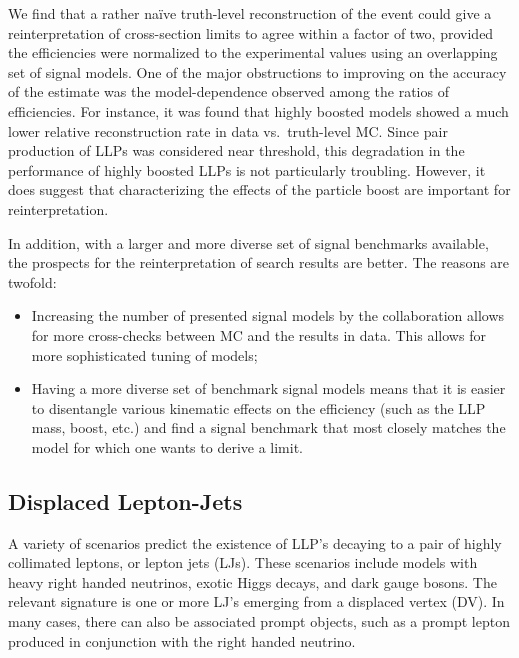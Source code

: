\vskip 0.1in
\vskip 0.1in

We find that a rather na\"ive truth-level reconstruction of the event could give a reinterpretation of cross-section limits to agree within a factor of two, provided the efficiencies were normalized to the experimental values using an overlapping set of signal models. One of the major obstructions to improving on the accuracy of the estimate was the model-dependence observed among the ratios of efficiencies. For instance, it was found that highly boosted models showed a much lower relative reconstruction rate in data vs.~truth-level MC. Since pair production of LLPs was considered near threshold, this degradation in the performance of highly boosted LLPs is not particularly troubling. However, it does suggest that characterizing the effects of the particle boost are important for reinterpretation.

In addition, with a larger and more diverse set of signal benchmarks available, the prospects for the reinterpretation of search results are better. The reasons are twofold:~
%
\begin{itemize}
\item Increasing the number of presented signal models by the collaboration allows for more cross-checks between MC and the results in data. This allows for more sophisticated tuning of models;
\item Having a more diverse set of benchmark signal models means that it is easier to disentangle various kinematic effects on the efficiency (such as the LLP mass, boost, etc.) and find a signal benchmark that most closely matches the model for which one wants to derive a limit.
\end{itemize}
%

\subsection{Displaced Lepton-Jets}

A variety of scenarios predict the existence of LLP's decaying to a pair of highly collimated leptons, or lepton jets (LJs). These scenarios include models with heavy right handed neutrinos, exotic Higgs decays, and dark gauge bosons. The relevant signature is one or more LJ's emerging from a displaced vertex (DV). In many cases, there can also be associated prompt objects, such as a prompt lepton produced in conjunction with the right handed neutrino. 

